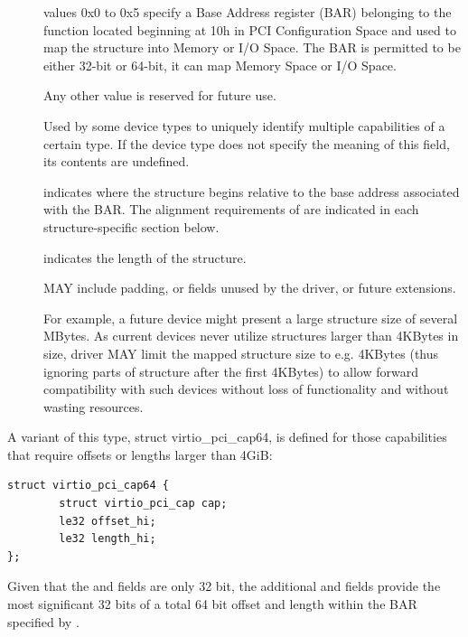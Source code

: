 \begin{description}
\item[]
        values 0x0 to 0x5 specify a Base Address register (BAR) belonging to
        the function located beginning at 10h in PCI Configuration Space
        and used to map the structure into Memory or I/O Space.
        The BAR is permitted to be either 32-bit or 64-bit, it can map Memory Space
        or I/O Space.

        Any other value is reserved for future use.

\item[]
        Used by some device types to uniquely identify multiple capabilities
        of a certain type. If the device type does not specify the meaning of
        this field, its contents are undefined.


\item[]
        indicates where the structure begins relative to the base address associated
        with the BAR.  The alignment requirements of  are indicated
        in each structure-specific section below.

\item[]
        indicates the length of the structure.

         MAY include padding, or fields unused by the driver, or
        future extensions.

        \begin{note}
        For example, a future device might present a large structure size of several
        MBytes.
        As current devices never utilize structures larger than 4KBytes in size,
        driver MAY limit the mapped structure size to e.g.
        4KBytes (thus ignoring parts of structure after the first
        4KBytes) to allow forward compatibility with such devices without loss of
        functionality and without wasting resources.
        \end{note}
\end{description}

A variant of this type, struct virtio_pci_cap64, is defined for
those capabilities that require offsets or lengths larger than
4GiB:

\begin{lstlisting}
struct virtio_pci_cap64 {
        struct virtio_pci_cap cap;
        le32 offset_hi;
        le32 length_hi;
};
\end{lstlisting}

Given that the  and  fields
are only 32 bit, the additional  and 
fields provide the most significant 32 bits of a total 64 bit offset and
length within the BAR specified by .

